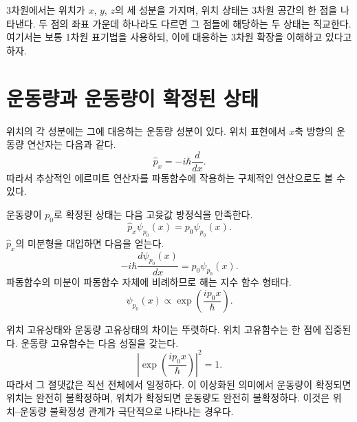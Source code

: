 3차원에서는 위치가 \(x\), \(y\), \(z\)의 세 성분을 가지며, 위치 상태는 3차원 공간의 한 점을 나타낸다. 두 점의 좌표 가운데 하나라도 다르면 그 점들에 해당하는 두 상태는 직교한다. 여기서는 보통 1차원 표기법을 사용하되, 이에 대응하는 3차원 확장을 이해하고 있다고 하자.

\section{운동량과 운동량이 확정된 상태}

위치의 각 성분에는 그에 대응하는 운동량 성분이 있다. 위치 표현에서 \(x\)축 방향의 운동량 연산자는 다음과 같다.
\begin{equation}
\hat p_x=-i\hbar\frac{d}{dx}.
\end{equation}
따라서 추상적인 에르미트 연산자를 파동함수에 작용하는 구체적인 연산으로도 볼 수 있다.

운동량이 \(p_0\)로 확정된 상태는 다음 고윳값 방정식을 만족한다.
\begin{equation}
\hat p_x\psi_{p_0}(x)=p_0\psi_{p_0}(x).
\end{equation}
\(\hat p_x\)의 미분형을 대입하면 다음을 얻는다.
\begin{equation}
-i\hbar\frac{d\psi_{p_0}(x)}{dx}
=p_0\psi_{p_0}(x).
\end{equation}
파동함수의 미분이 파동함수 자체에 비례하므로 해는 지수 함수 형태다.
\begin{equation}
\psi_{p_0}(x)\propto
\exp\left(\frac{ip_0x}{\hbar}\right).
\end{equation}

\begin{classroomqa}
\end{classroomqa}

위치 고유상태와 운동량 고유상태의 차이는 뚜렷하다. 위치 고유함수는 한 점에 집중된다. 운동량 고유함수는 다음 성질을 갖는다.
\begin{equation}
\left|\exp\left(\frac{ip_0x}{\hbar}\right)\right|^2=1.
\end{equation}
따라서 그 절댓값은 직선 전체에서 일정하다. 이 이상화된 의미에서 운동량이 확정되면 위치는 완전히 불확정하며, 위치가 확정되면 운동량도 완전히 불확정하다. 이것은 위치--운동량 불확정성 관계가 극단적으로 나타나는 경우다.

